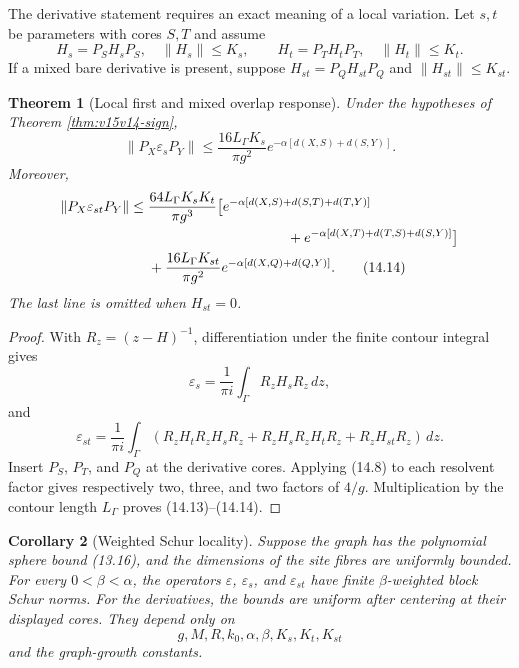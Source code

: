 \documentclass[11pt]{article}
\newtheorem{theorem}{Theorem}[section]
\newtheorem{corollary}[theorem]{Corollary}
\theoremstyle{remark}
\begin{document}
The derivative statement requires an exact meaning of a local
variation.  Let \(s,t\) be parameters with cores \(S,T\) and assume
\[
 H_s=P_SH_sP_S,\quad \|H_s\|\le K_s,\qquad
 H_t=P_TH_tP_T,\quad \|H_t\|\le K_t.                         \tag{14.12}
\]
If a mixed bare derivative is present, suppose
\(H_{st}=P_QH_{st}P_Q\) and \(\|H_{st}\|\le K_{st}\).

\begin{theorem}[Local first and mixed overlap response]
\label{thm:v15v14-derivatives}
Under the hypotheses of Theorem \ref{thm:v15v14-sign},
\[
 \boxed{
 \|P_X\varepsilon_sP_Y\|
 \le\frac{16L_\Gamma K_s}{\pi g^2}
 e^{-\alpha[d(X,S)+d(S,Y)]}.}                              \tag{14.13}
\]
Moreover,
\[
\begin{aligned}
 \|P_X\varepsilon_{st}P_Y\|
 \le{}&
 \frac{64L_\Gamma K_sK_t}{\pi g^3}
 \bigl[
 e^{-\alpha[d(X,S)+d(S,T)+d(T,Y)]}\\
 &\hspace{35mm}+
 e^{-\alpha[d(X,T)+d(T,S)+d(S,Y)]}
 \bigr]\\
 &+\frac{16L_\Gamma K_{st}}{\pi g^2}
 e^{-\alpha[d(X,Q)+d(Q,Y)]}.                               \tag{14.14}
\end{aligned}
\]
The last line is omitted when \(H_{st}=0\).
\end{theorem}

\begin{proof}
With \(R_z=(z-H)^{-1}\), differentiation under the finite contour
integral gives
\[
 \varepsilon_s
 =\frac{1}{\pi i}\int_\Gamma R_zH_sR_z\,dz,                 \tag{14.15}
\]
and
\[
 \varepsilon_{st}
 =\frac{1}{\pi i}\int_\Gamma
 \left(
 R_zH_tR_zH_sR_z+
 R_zH_sR_zH_tR_z+
 R_zH_{st}R_z
 \right)\,dz.                                               \tag{14.16}
\]
Insert \(P_S\), \(P_T\), and \(P_Q\) at the derivative cores.
Applying (14.8) to each resolvent factor gives respectively two,
three, and two factors of \(4/g\).  Multiplication by the contour
length \(L_\Gamma\) proves (14.13)--(14.14).
\end{proof}

\begin{corollary}[Weighted Schur locality]
\label{cor:v15v14-schur}
Suppose the graph has the polynomial sphere bound (13.16), and the
dimensions of the site fibres are uniformly bounded.  For every
\(0<\beta<\alpha\), the operators
\(\varepsilon\), \(\varepsilon_s\), and
\(\varepsilon_{st}\) have finite \(\beta\)-weighted block Schur
norms.  For the derivatives, the bounds are uniform after centering
at their displayed cores.  They depend only on
\[
 g,M,R,k_0,\alpha,\beta,K_s,K_t,K_{st}
\]
and the graph-growth constants.
\end{corollary}
\end{document}
